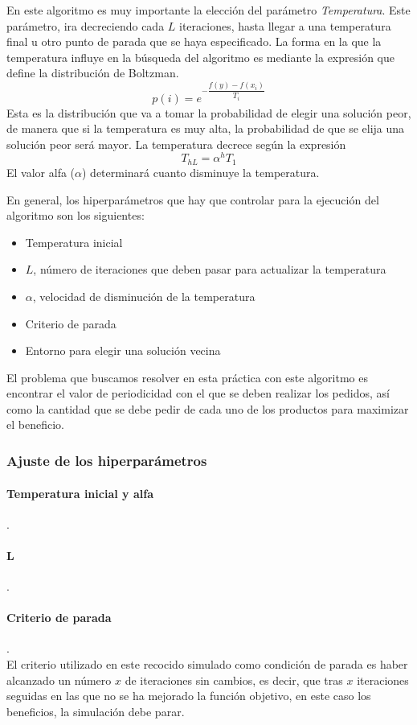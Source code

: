 \documentclass[a4paper,12pt]{article}
\begin{document}
	En este algoritmo es muy importante la elección del parámetro \textit{Temperatura}. Este parámetro, ira decreciendo cada $L$ iteraciones, hasta llegar a una temperatura final u otro punto de parada que se haya especificado. La forma en la que la temperatura influye en la búsqueda del algoritmo es mediante la expresión que define la distribución de Boltzman. 
	$$p(i)=e^{-\dfrac{f(y)-f(x_i)}{T_i}}$$
	Esta es la distribución que va a tomar la probabilidad de elegir una solución peor, de manera que si la temperatura es muy alta, la probabilidad de que se elija una solución peor será mayor. La temperatura decrece según la expresión
	$$T_{hL}=\alpha ^h T_1$$
	El valor alfa ($\alpha$) determinará cuanto disminuye la temperatura.
	
	En general, los hiperparámetros que hay que controlar para la ejecución del algoritmo son los siguientes:
	\begin{itemize}
		\item Temperatura inicial
		\item $L$, número de iteraciones que deben pasar para actualizar la temperatura
		\item $\alpha$, velocidad de disminución de la temperatura
		\item Criterio de parada
		\item Entorno para elegir una solución vecina
	\end{itemize}
	
	El problema que buscamos resolver en esta práctica con este algoritmo es encontrar el valor de periodicidad con el que se deben realizar los pedidos, así como la cantidad que se debe pedir de cada uno de los productos para maximizar el beneficio.
	
	\subsubsection{Ajuste de los hiperparámetros}
	
	\paragraph{Temperatura inicial y alfa}.\\
	
	\paragraph{L}.\\
	
	\paragraph{Criterio de parada}.\\
	El criterio utilizado en este recocido simulado como condición de parada es haber alcanzado un número $x$ de iteraciones sin cambios, es decir, que tras $x$ iteraciones seguidas en las que no se ha mejorado la función objetivo, en este caso los beneficios, la simulación debe parar.\\
		
\end{document}
